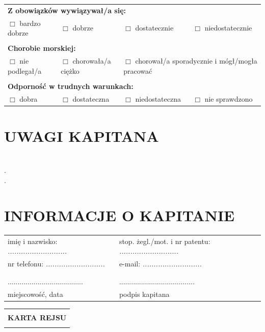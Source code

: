 \documentclass{article}
\begin{document}
\begin{tabularx}{\textwidth}{X X X X}
\multicolumn{4}{l}{\textbf{Z obowiązków wywiązywał/a się:}}\\
$\Box$ bardzo dobrze & $\Box$ dobrze & $\Box$ dostatecznie & $\Box$ niedostatecznie\\
\\
\multicolumn{4}{l}{\textbf{Chorobie morskiej:}}\\
$\Box$ nie podlegał/a & $\Box$ chorowała/a ciężko & \multicolumn{2}{l}{$\Box$ chorował/a sporadycznie i mógł/mogła pracować}\\
\\
\multicolumn{4}{l}{\textbf{Odporność w trudnych warunkach:}}\\
$\Box$ dobra & $\Box$ dostateczna & $\Box$ niedostateczna & $\Box$ nie sprawdzono\\
\end{tabularx}

\section*{UWAGI KAPITANA}


\textit{}\dotfill \\
.\dotfill \\
.\dotfill \\
\section*{INFORMACJE O KAPITANIE}

\begin{tabularx}{\textwidth}{X X}
imię i nazwisko: \textit{...........................} & stop. żegl./mot. i nr patentu: \textit{...........................}\\
nr telefonu: \textit{...........................} & e-mail: \textit{...........................}\\
\\\\
...................................... & ......................................\\
miejscowość, data & podpis kapitana\\
\end{tabularx}
\newpage
\begin{tabularx}{\textwidth} { 
  | >{\centering\arraybackslash}X | }
 \hline
 \\
 \textbf{\huge KARTA REJSU} \\
 \\
\hline
\end{tabularx}
\end{document}
